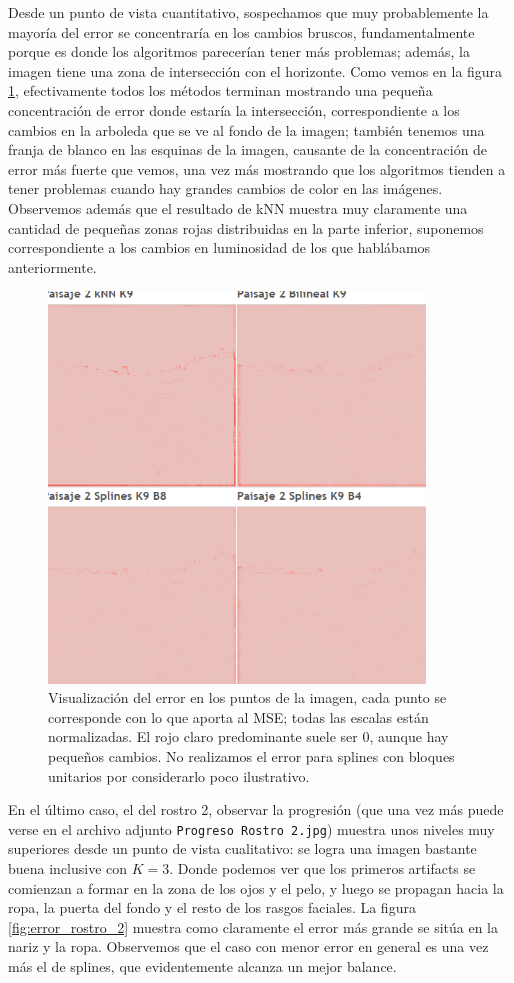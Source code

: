 \documentclass{article}
\begin{document}
Desde un punto de vista cuantitativo, sospechamos que muy probablemente la mayoría del error se concentraría en los cambios bruscos, fundamentalmente porque es donde los algoritmos parecerían tener más problemas; además, la imagen tiene una zona de intersección con el horizonte. Como vemos en la figura \ref{fig:error_paisaje_2}, efectivamente todos los métodos terminan mostrando una pequeña concentración de error donde estaría la intersección, correspondiente a los cambios en la arboleda que se ve al fondo de la imagen; también tenemos una franja de blanco en las esquinas de la imagen, causante de la concentración de error más fuerte que vemos, una vez más mostrando que los algoritmos tienden a tener problemas cuando hay grandes cambios de color en las imágenes. Observemos además que el resultado de kNN muestra muy claramente una cantidad de pequeñas zonas rojas distribuidas en la parte inferior, suponemos correspondiente a los cambios en luminosidad de los que hablábamos anteriormente.

\begin{figure}[H]
\centering
\includegraphics[width=10cm]{Error Paisaje 2}
\caption{Visualización del error en los puntos de la imagen, cada punto se corresponde con lo que aporta al MSE; todas las escalas están normalizadas. El rojo claro predominante suele ser 0, aunque hay pequeños cambios. No realizamos el error para splines con bloques unitarios por considerarlo poco ilustrativo.}
\label{fig:error_paisaje_2}
\end{figure}

En el último caso, el del rostro 2, observar la progresión (que una vez más puede verse en el archivo adjunto \texttt{Progreso Rostro 2.jpg}) muestra unos niveles muy superiores desde un punto de vista cualitativo: se logra una imagen bastante buena inclusive con $K=3$. Donde podemos ver que los primeros artifacts se comienzan a formar en la zona de los ojos y el pelo, y luego se propagan hacia la ropa, la puerta del fondo y el resto de los rasgos faciales. La figura \ref{fig:error_rostro_2} muestra como claramente el error más grande se sitúa en la nariz y la ropa. Observemos que el caso con menor error en general es una vez más el de splines, que evidentemente alcanza un mejor balance.
\end{document}
